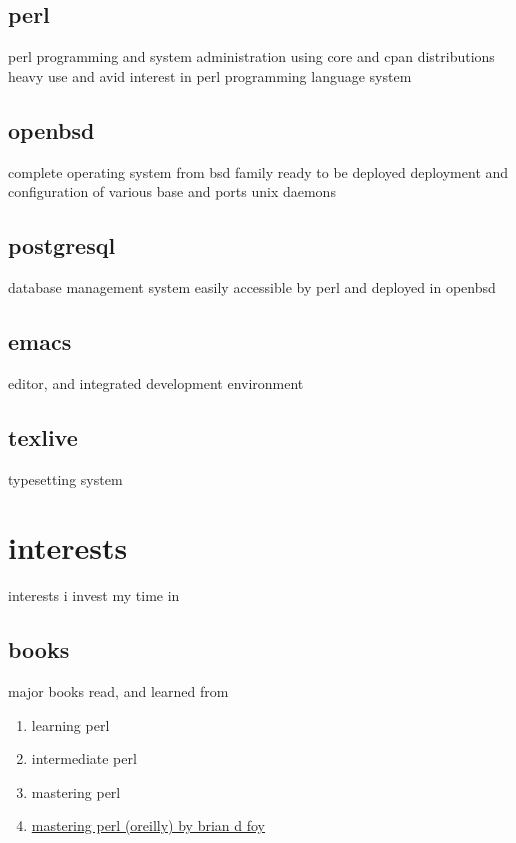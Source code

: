 \documentclass{article}
\begin{document}
\subsection{perl}
perl programming and system administration using core and cpan distributions
heavy use and avid interest in perl programming language system
\subsection{openbsd}
complete operating system from bsd family ready to be deployed
deployment and configuration of various base and ports unix daemons
\subsection{postgresql}
database management system easily accessible by perl and deployed in openbsd
\subsection{emacs}
editor, and integrated development environment
\subsection{texlive}
typesetting system
\section{interests}
interests i invest my time in
\subsection{books}
major books read, and learned from
\begin{enumerate}
\item{learning perl\cite{learning_perl}}
\item{intermediate perl\cite{intermediate_perl}}
\item{mastering perl\cite{mastering_perl}}
\item \href{https://www.oreilly.com/library/view/mastering-perl-2nd/9781449364946/}{mastering perl (oreilly) by brian d foy}
\end{enumerate}
\end{document}
